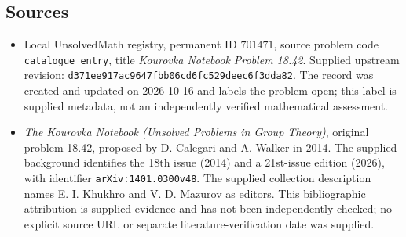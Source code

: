 \documentclass[11pt]{article}
\begin{document}
\subsection{Sources}
\begin{itemize}
\item Local UnsolvedMath registry, permanent ID \(701471\), source problem code \texttt{catalogue entry}, title \emph{Kourovka Notebook Problem 18.42}. Supplied upstream revision: \texttt{d371ee917ac9647fbb06cd6fc529deec6f3dda82}. The record was created and updated on 2026-10-16 and labels the problem open; this label is supplied metadata, not an independently verified mathematical assessment.
\item \emph{The Kourovka Notebook (Unsolved Problems in Group Theory)}, original problem 18.42, proposed by D. Calegari and A. Walker in 2014. The supplied background identifies the 18th issue (2014) and a 21st-issue edition (2026), with identifier \texttt{arXiv:1401.0300v48}. The supplied collection description names E. I. Khukhro and V. D. Mazurov as editors. This bibliographic attribution is supplied evidence and has not been independently checked; no explicit source URL or separate literature-verification date was supplied.
\end{itemize}
\end{document}
